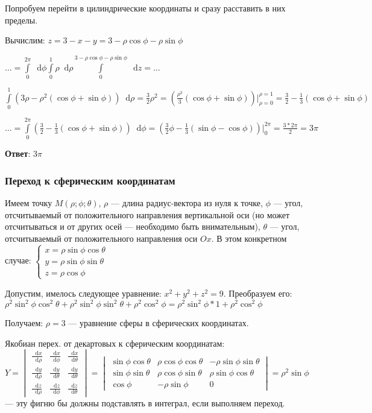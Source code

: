 \documentclass{article}
\newcommand*\diff{\mathop{}\!\mathrm{d}}
\begin{document}
Попробуем перейти в цилиндрические координаты и сразу расставить в них пределы.

Вычислим: $z = 3 - x - y = 3 - \rho \cos \phi - \rho \sin \phi$

$\dots = \int\limits_{0}^{2 \pi} \diff \phi \int\limits_{0}^{1} \rho \diff \rho \int\limits_{0}^{3-\rho \cos \phi - \rho \sin \phi} \diff z = \dots$

$\int\limits_{0}^{1} (3 \rho - \rho^2 (\cos \phi + \sin \phi)) \diff \rho = \frac{3}{2} \rho^2 = (\frac{\rho^{3}}{3} (\cos \phi + \sin \phi)) \bigg|_{\rho = 0}^{\rho = 1} = \frac{3}{2} - \frac{1}{3} (\cos \phi + \sin \phi)$

$\dots = \int\limits_{0}^{2 \pi} (\frac{3}{2} - \frac{1}{3} (\cos \phi + \sin \phi)) \diff \phi = (\frac{3}{2} \phi - \frac{1}{3} (\sin \phi - \cos \phi)) \bigg|_{0}^{2 \pi} = \frac{3 * 2 \pi}{2} = 3 \pi$

\textbf{Ответ}: $3 \pi$

\subsubsection{Переход к сферическим координатам}

Имеем точку $M(\rho; \phi; \theta)$, $\rho$ — длина радиус-вектора из нуля к точке, $\phi$ — угол, отсчитываемый от положительного направления вертикальной оси (но может отсчитываться и от других осей — необходимо быть внимательным), $\theta$ — угол, отсчитываемый от положительного направления оси $Ox$. В этом конкретном случае: $
\begin{cases}
    x = \rho \sin \phi \cos \theta \\
    y = \rho \sin \phi \sin \theta \\
    z = \rho \cos \phi
\end{cases}$


Допустим, имелось следующее уравнение: $x^2 + y^2 + z^2 = 9$. Преобразуем его: $\rho^2 \sin^2 \phi \cos^2 \theta + \rho^2 \sin^2 \phi \sin^2 \theta + \rho^2 \cos^2 \phi = \rho^2 \sin^2 \phi * 1 + \rho^2 \cos^2 \phi$

Получаем: $\rho = 3$ — уравнение сферы в сферических координатах.

Якобиан перех. от декартовых к сферическим координатам: $Y = \begin{vmatrix}
    \frac{\diff x}{\diff \rho} & \frac{\diff x}{\diff \phi} & \frac{\diff x}{\diff \theta} \\
    \frac{\diff y}{\diff \rho} & \frac{\diff y}{\diff \theta} & \frac{\diff y}{\diff \theta} \\
    \frac{\diff z}{\diff \rho} & \frac{\diff z}{\diff \phi} & \frac{\diff z}{\diff \theta}
\end{vmatrix} = \begin{vmatrix}
        \sin \phi \cos \theta & \rho \cos \phi \cos \theta & -\rho \sin \phi \sin \theta \\
        \sin \phi \sin \theta & \rho \cos \phi \sin \theta & \rho \sin \phi \cos \theta \\
        \cos \phi & - \rho \sin \phi & 0
\end{vmatrix} = \rho^2 \sin \phi$ — эту фигню бы должны подставлять в интеграл, если выполняем переход.
\end{document}
